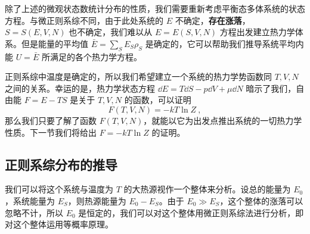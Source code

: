 除了上述的微观状态数统计分布的性质，我们需要重新考虑平衡态多体系统的状态方程。与微正则系综不同，由于此处系统的 $E$ 不确定，\textbf{存在涨落}，$S=S(E,V,N)$ 也不确定，我们难以从 $E=E(S,V,N)$ 方程出发建立热力学体系。但是能量的平均值 $\bar E=\sum_S E_S \rho_S$ 是确定的，它可以帮助我们推导系统平均内能 $U=\bar E$ 所满足的各个热力学方程。

正则系综中温度是确定的，所以我们希望建立一个系统的热力学势函数同 $T,V,N$ 之间的关系。幸运的是，热力学状态方程 $\dd E=T\dd S-p\dd V+\mu\dd N$ 暗示了我们，自由能 $F=E-TS$ 是关于 $T,V,N$ 的函数，可以证明 
\begin{equation}
F(T,V,N)=-kT\ln Z~,
\end{equation}
那么我们只要了解了函数 $F(T,V,N)$，就能以它为出发点推出系统的一切热力学性质。下一节我们将给出 $F=-kT\ln Z$ 的证明。

\subsection{正则系综分布的推导}
我们可以将这个系统与温度为 $T$ 的大热源视作一个整体来分析。设总的能量为 $E_0$，系统能量为 $E_S$，则热源能量为 $E_0-E_S$。由于 $E_0\gg E_S$，这个整体的涨落可以忽略不计，所以 $E_0$ 是恒定的，我们可以对这个整体用微正则系综法进行分析，即对这个整体运用等概率原理。

